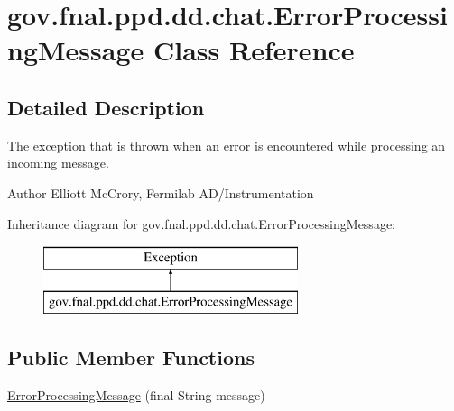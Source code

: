 \hypertarget{classgov_1_1fnal_1_1ppd_1_1dd_1_1chat_1_1ErrorProcessingMessage}{\section{gov.\-fnal.\-ppd.\-dd.\-chat.\-Error\-Processing\-Message Class Reference}
\label{classgov_1_1fnal_1_1ppd_1_1dd_1_1chat_1_1ErrorProcessingMessage}
}


\subsection{Detailed Description}
The exception that is thrown when an error is encountered while processing an incoming message.

\begin{DoxyAuthor}{Author}
Elliott Mc\-Crory, Fermilab A\-D/\-Instrumentation 
\end{DoxyAuthor}
Inheritance diagram for gov.\-fnal.\-ppd.\-dd.\-chat.\-Error\-Processing\-Message\-:\begin{figure}[H]
\begin{center}
\leavevmode
\includegraphics[height=2.000000cm]{classgov_1_1fnal_1_1ppd_1_1dd_1_1chat_1_1ErrorProcessingMessage}
\end{center}
\end{figure}
\subsection*{Public Member Functions}
\begin{DoxyCompactItemize}
\item 
\hyperlink{classgov_1_1fnal_1_1ppd_1_1dd_1_1chat_1_1ErrorProcessingMessage_a8bd09b8af0e6baf740f7e965086b15d8}{Error\-Processing\-Message} (final String message)
\end{DoxyCompactItemize}


